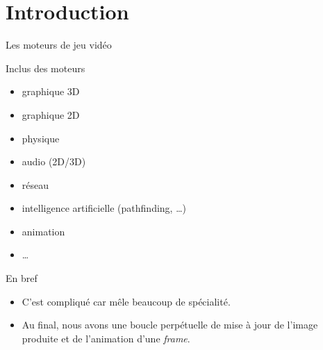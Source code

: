 \section{Introduction}


\begin{frame}[fragile]{Les moteurs de jeu vidéo}  
  
  \begin{block}{Inclus des moteurs}
    \begin{itemize}
    \item graphique 3D
    \item graphique 2D
    \item physique
    \item audio (2D/3D)
    \item réseau
    \item intelligence artificielle (pathfinding, \ldots)
    \item animation
    \item \ldots
    \end{itemize}
  \end{block}

\begin{alertblock}{En bref}
\begin{itemize}
	\item C'est compliqué car mêle beaucoup de spécialité.
	\item Au final, nous avons une boucle perpétuelle de mise à jour de l'image produite et de l'animation d'une \textit{frame}.
\end{itemize}	
\end{alertblock}

\end{frame}


